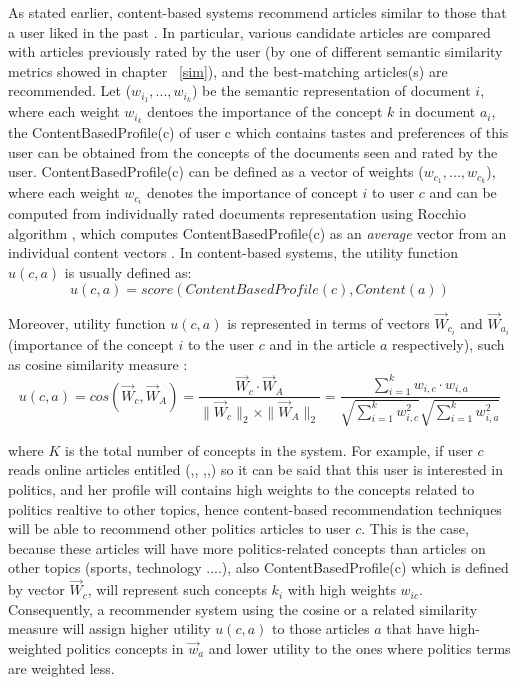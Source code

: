 As stated earlier, content-based systems recommend articles similar to those that a user liked in the past  \citep{recom_56}  \citep{recom_69}  \citep{recom_77}. In particular, various candidate articles are compared with articles previously rated by the user (by one of different semantic similarity metrics showed in chapter ~\ref{sim}), and the best-matching articles(s) are recommended. Let ($w_{i_1},...,w_{i_k}$) be the semantic representation of document $i$, where each weight $w_{i_k}$ dentoes the importance of the concept $k$ in document $a_i$, the ContentBasedProfile(c) of user c which contains tastes and preferences of this user can be obtained from  the concepts of the documents seen and rated by the user. ContentBasedProfile(c) can be defined as a vector of weights ($w_{c_1},...,w_{c_k}$), where each weight $w_{c_i}$ denotes the importance of concept $i$ to user $c$ and can be computed from individually rated documents representation using Rocchio algorithm  \citep{recom_85}, which computes ContentBasedProfile(c) as an \textit{average} vector from an individual content vectors  \citep{recom_8}  \citep{recom_56}.
In content-based systems, the utility function $u(c, a)$ is usually defined as:
\begin{equation}\label{eq:5}
u(c,a)= score(ContentBasedProfile(c),Content(a))
\end{equation}


Moreover, utility function $u(c, a)$ is represented in terms of vectors $\vec{W}_{c_i}$   and $\vec{W}_{a_i}$ (importance of the concept $i$ to the user $c$ and in the article $a$ respectively), such as cosine similarity measure \citep{recom_7} \citep{recom_89}:
\begin{equation}\label{eq:6}
	u(c,a) = cos(\vec{W}_c, \vec{W}_A) = \frac{\vec{W}_c \cdot \vec{W}_A}{ \|\vec{W}_c\|_2 \times \|\vec{W}_A\|_2} = 
	\frac{\sum\limits_{i=1}^k w_{i,c} \cdot w_{i,a}}{\sqrt{\sum\limits_{i=1}^k w_{i,c}^2} \sqrt{\sum\limits_{i=1}^k w_{i,a}^2}}
\end{equation}


where $K$ is the total number of concepts in the system.
For example, if user $c$ reads online articles entitled (,, ,,) so it can be said that this user is interested in politics, and her profile will contains high weights to the concepts related to politics realtive to other topics, hence content-based recommendation techniques will be able to recommend other politics articles to user $c$. This is the case, because these articles will have more politics-related concepts than articles on other topics (sports, technology ....), also ContentBasedProfile(c) which is defined by vector $\vec{W}_c$, will represent such concepts $k_i$ with high weights $w_{ic}$. Consequently, a recommender system using the cosine or a related similarity measure will assign higher utility $u(c, a)$ to those articles $a$ that have high-weighted politics concepts in $\vec{w}_a $ and lower utility to the ones where politics terms are weighted less.

